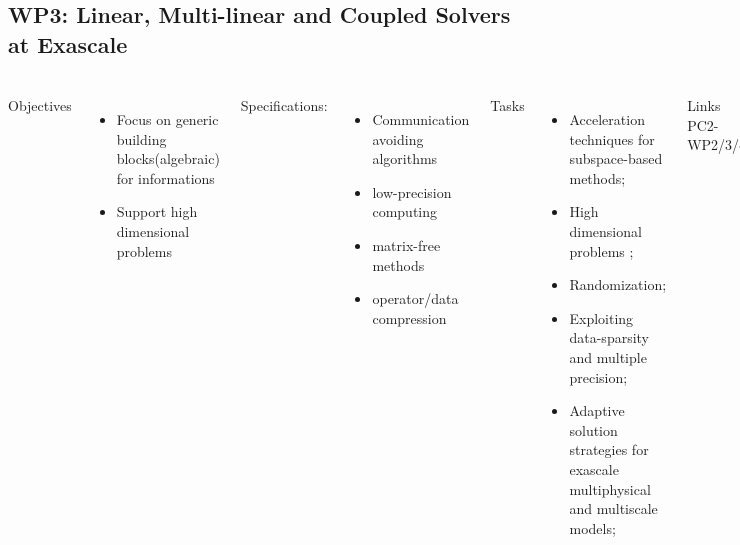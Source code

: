 \subsection{WP3: Linear, Multi-linear and Coupled Solvers at Exascale}
\begin{frame}
  \frametitle{\insertsectionhead}
  \framesubtitle{\insertsubsectionhead}
  \footnotesize
  \begin{columns}[t]
    Objectives
    \begin{itemize}
      \item Focus on generic building blocks(algebraic) for informations
      \item Support high dimensional problems
    \end{itemize}
    Specifications: 
    \begin{itemize}
      \item Communication avoiding algorithms
      \item low-precision computing
      \item matrix-free methods
      \item operator/data compression
    \end{itemize}
    Tasks
    \begin{itemize}
      \item Acceleration techniques for subspace-based methods;
      \item High dimensional problems ;
      \item Randomization;
      \item Exploiting data-sparsity and multiple precision;
      \item Adaptive solution strategies for exascale multiphysical and multiscale models;
    \end{itemize}
    \begin{alertblock}{Links}
    PC2-WP2/3/4 
  \end{alertblock}
  \end{columns}
\end{frame}

